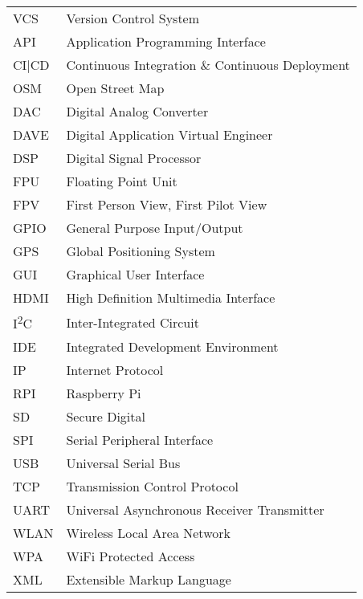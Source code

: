 \begin{singlespace}
\begin{flushleft}
\begin{longtable}{p{2 cm}p{14 cm}}
  VCS & Version Control System \\
  API & Application Programming Interface \\
  CI|CD & Continuous Integration \& Continuous Deployment \\
  OSM & Open Street Map \\
  DAC & Digital Analog Converter \\
  DAVE & Digital Application Virtual Engineer \\
  DSP & Digital Signal Processor \\
  FPU & Floating Point Unit \\
  FPV & First Person View, First Pilot View \\
  GPIO & General Purpose Input/Output \\
  GPS & Global Positioning System \\
  GUI & Graphical User Interface \\	
  HDMI & High Definition Multimedia Interface \\
  I\textsuperscript{2}C & Inter-Integrated Circuit \\
  IDE & Integrated Development Environment \\
  IP & Internet Protocol \\
  RPI & Raspberry Pi \\
  SD & Secure Digital \\
  SPI & Serial Peripheral Interface \\
  USB & Universal Serial Bus \\
  TCP & Transmission Control Protocol \\
  UART & Universal Asynchronous Receiver Transmitter \\
  WLAN & Wireless Local Area Network \\
  WPA & WiFi Protected Access \\
  XML & Extensible Markup Language \\
\end{longtable}
\end{flushleft}
\end{singlespace}
